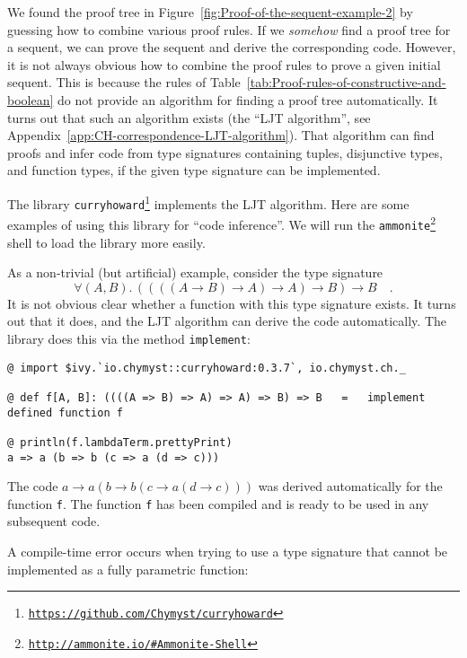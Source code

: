 We found the proof tree in Figure~\ref{fig:Proof-of-the-sequent-example-2}
by guessing how to combine various proof rules. If we \emph{somehow}
find a proof tree for a sequent, we can prove the sequent and derive
the corresponding code. However, it is not always obvious how to combine
the proof rules to prove a given initial sequent. This is because
the rules of Table~\ref{tab:Proof-rules-of-constructive-and-boolean}
do not provide an algorithm for finding a proof tree automatically.
It turns out that such an algorithm exists (the \textsf{``}LJT
algorithm\textsf{''}, see Appendix~\ref{app:CH-correspondence-LJT-algorithm}).
That algorithm can find proofs and infer code from type signatures
containing tuples, disjunctive types, and function types, if the given
type signature can be implemented.

The library \texttt{curryhoward}\footnote{\texttt{\href{https://github.com/Chymyst/curryhoward}{https://github.com/Chymyst/curryhoward}}}
implements the LJT algorithm. Here are some examples of using this
library for \textsf{``}code inference\textsf{''}. We will run
the \texttt{ammonite}\footnote{\texttt{\href{http://ammonite.io/\#Ammonite-Shell}{http://ammonite.io/\#Ammonite-Shell}}}
shell to load the library more easily.

As a non-trivial (but artificial) example, consider the type signature
\[
\forall(A,B).\,\left(\left(\left(\left(A\rightarrow B\right)\rightarrow A\right)\rightarrow A\right)\rightarrow B\right)\rightarrow B\quad.
\]
It is not obvious clear whether a function with this type signature
exists. It turns out that it does, and the LJT algorithm can derive
the code automatically. The library does this via the method \lstinline!implement!:
\begin{lstlisting}
@ import $ivy.`io.chymyst::curryhoward:0.3.7`, io.chymyst.ch._

@ def f[A, B]: ((((A => B) => A) => A) => B) => B   =   implement
defined function f

@ println(f.lambdaTerm.prettyPrint)
a => a (b => b (c => a (d => c)))
\end{lstlisting}
The code $a\rightarrow a\left(b\rightarrow b\left(c\rightarrow a\left(d\rightarrow c\right)\right)\right)$
was derived automatically for the function \lstinline!f!. The function
\lstinline!f! has been compiled and is ready to be used in any subsequent
code.

A compile-time error occurs when trying to use a type signature that
cannot be implemented as a fully parametric function:

